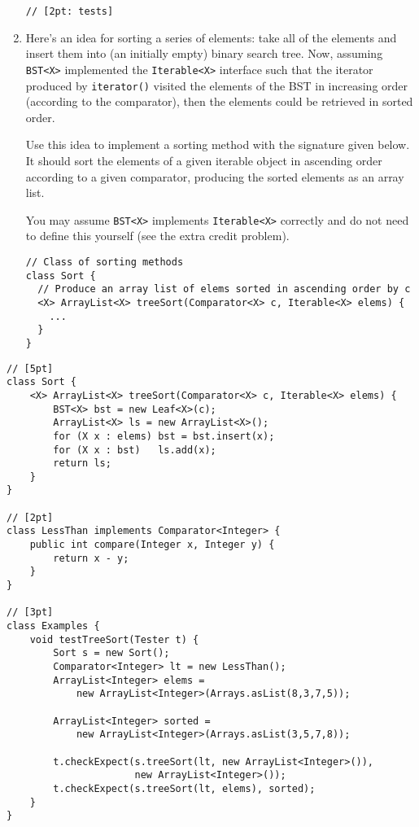 \documentclass[12pt]{article}                   %
\newenvironment{solution}{\color{Red}}{}
\begin{document}
\begin{problem}
\begin{enumerate}
\begin{solution}
\begin{verbatim}
// [2pt: tests]
\end{verbatim}
\end{solution}

\else
{}
\fi

\newpage
\item Here's an idea for sorting a series of elements: take all of the
 elements and insert them into (an initially empty) binary search
 tree.  Now, assuming \texttt{BST<X>} implemented the
 \texttt{Iterable<X>} interface such that the iterator produced by
 \texttt{iterator()} visited the elements of the BST in increasing
 order (according to the comparator), then the elements could be retrieved
in sorted order.

Use this idea to implement a sorting method with the signature given
 below.  It should sort the elements of a given iterable object in ascending order
 according to a given comparator, producing the sorted elements as an
 array list.

You may assume \texttt{BST<X>} implements \texttt{Iterable<X>} correctly
and do not need to define this yourself (see the extra credit problem).

{\small
\begin{verbatim}
// Class of sorting methods
class Sort {
  // Produce an array list of elems sorted in ascending order by c
  <X> ArrayList<X> treeSort(Comparator<X> c, Iterable<X> elems) { 
    ... 
  }
}
\end{verbatim}}
\end{enumerate}

\ifrubric
\begin{solution}
\begin{verbatim}
// [5pt]
class Sort {
    <X> ArrayList<X> treeSort(Comparator<X> c, Iterable<X> elems) {
        BST<X> bst = new Leaf<X>(c);
        ArrayList<X> ls = new ArrayList<X>();
        for (X x : elems) bst = bst.insert(x);
        for (X x : bst)   ls.add(x);
        return ls;
    }
}

// [2pt]
class LessThan implements Comparator<Integer> {
    public int compare(Integer x, Integer y) {
        return x - y;
    }
}

// [3pt]
class Examples {
    void testTreeSort(Tester t) {
        Sort s = new Sort();
        Comparator<Integer> lt = new LessThan();
        ArrayList<Integer> elems =
            new ArrayList<Integer>(Arrays.asList(8,3,7,5));
        
        ArrayList<Integer> sorted =
            new ArrayList<Integer>(Arrays.asList(3,5,7,8));

        t.checkExpect(s.treeSort(lt, new ArrayList<Integer>()),
                      new ArrayList<Integer>());
        t.checkExpect(s.treeSort(lt, elems), sorted);
    }
}
\end{verbatim}
\end{solution}
\else
{}
\fi
\newpage
\newpage
\end{problem}
\end{document}
